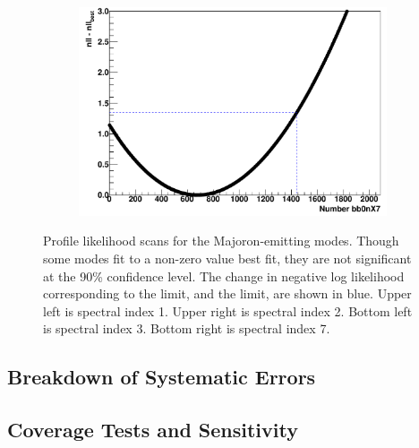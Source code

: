 \documentclass[herrin-thesis.tex]{subfiles}
\begin{document}
\begin{figure}[htb]
\begin{subfigure}[c]{0.48\textwidth}
	\end{subfigure}\hfill%
	\begin{subfigure}[c]{0.48\textwidth}
	\centering
	\includegraphics[width=\textwidth]{./plots/analysis_bb0nX7_profile.pdf}
	\end{subfigure}
\caption[Profile likelihoods for \(0\nu\beta\beta\chi^0(\chi^0)\)]{Profile likelihood scans for the Majoron-emitting modes. Though some modes fit to a non-zero value best fit, they are not significant at the 90\% confidence level. The change in negative log likelihood corresponding to the limit, and the limit, are shown in blue. Upper left is spectral index 1. Upper right is spectral index 2. Bottom left is spectral index 3. Bottom right is spectral index 7.}
\label{fig:analysis_bb0nX_profiles}
\end{figure}

\subsection{Breakdown of Systematic Errors}
\subsection{Coverage Tests and Sensitivity}
\end{document}

